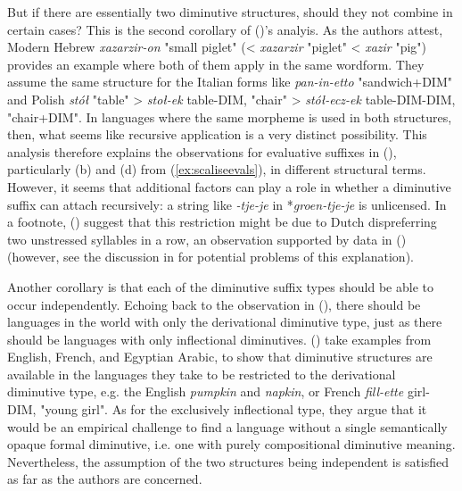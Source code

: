 But if there are essentially two diminutive structures, should they not combine in certain cases? This is the second corollary of \citeauthor{DeBelder+etal+2014} (\citeyear{DeBelder+etal+2014})'s analyis. As the authors attest, Modern Hebrew \textit{xazarzir-on} "small piglet" (< \textit{xazarzir} "piglet"  < \textit{xazir} "pig") provides an example where both of them apply in the same wordform. They assume the same structure for the Italian forms like \textit{pan-in-etto} "sandwich+DIM" and Polish \textit{stół} "table" > \textit{stoł-ek} table-DIM, "chair" > \textit{stół-ecz-ek} table-DIM-DIM, "chair+DIM". In languages where the same morpheme is used in both structures, then, what seems like recursive application is a very distinct possibility. This analysis therefore explains the observations for evaluative suffixes in \citeauthor{Scalise+1986} (\citeyear{Scalise+1986}), particularly (b) and (d) from (\ref{ex:scaliseevals}), in different structural terms. However, it seems that additional factors can play a role in whether a diminutive suffix can attach recursively: a string like \textit{-tje-je} in *\textit{groen-tje-je} is unlicensed. In a footnote, \citeauthor{DeBelder+etal+2014} (\citeyear{DeBelder+etal+2014}) suggest that this restriction might be due to Dutch dispreferring two unstressed syllables in a row, an observation supported by data in \citeauthor{Booij+1998} (\citeyear{Booij+1998}) (however, see the discussion in \cite{taalportaal} for potential problems of this explanation).

Another corollary is that each of the diminutive suffix types should be able to occur independently. Echoing back to the observation in \citeauthor{Schneider+2003} (\citeyear{Schneider+2003}), there should be languages in the world with only the derivational diminutive type, just as there should be languages with only inflectional diminutives. \citeauthor{DeBelder+etal+2014} (\citeyear{DeBelder+etal+2014}) take examples from English, French, and Egyptian Arabic, to show that diminutive structures are available in the languages they take to be restricted to the derivational diminutive type, e.g. the English \textit{pumpkin} and \textit{napkin}, or French \textit{fill-ette} girl-DIM, "young girl". As for the exclusively inflectional type, they argue that it would be an empirical challenge to find a language without a single semantically opaque formal diminutive, i.e. one with purely compositional diminutive meaning. Nevertheless, the assumption of the two structures being independent is satisfied as far as the authors are concerned.

